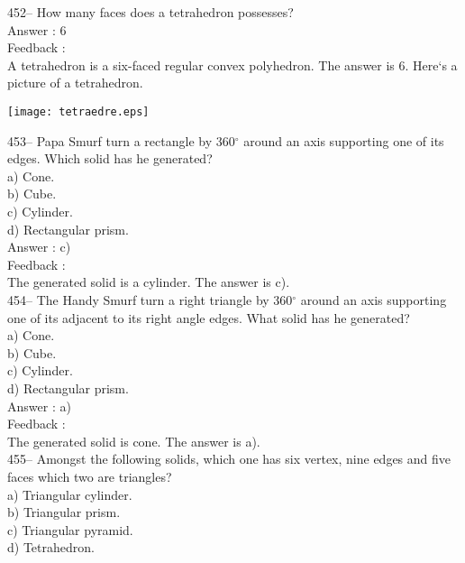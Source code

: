 \documentclass[letterpaper, 12pt]{article}
\begin{document}
452-- How many faces does a tetrahedron possesses?\\

Answer : 6\\

Feedback : \\
A tetrahedron is a six-faced regular convex polyhedron.  The answer is 6.  Here`s a picture of a tetrahedron.\\
    \begin{center}
    \texttt{[image: tetraedre.eps]}
    \end{center}


453--  Papa Smurf turn a rectangle by 360$^{\circ}$ around an axis supporting one of its edges. Which solid has he generated?\\
a) Cone.\\
b) Cube.\\
c) Cylinder.\\
d) Rectangular prism.\\


Answer : c)\\

Feedback :\\
The generated solid is a cylinder.  The answer is c).\\


454--  The Handy Smurf turn a right triangle by 360$^{\circ}$ around an axis supporting one of its adjacent to its right angle edges. What solid has he generated?\\
a) Cone.\\
b) Cube.\\
c) Cylinder.\\
d) Rectangular prism.\\

Answer : a)\\

Feedback :\\
The generated solid is cone.  The answer is a).\\

455-- Amongst the following solids, which one has six vertex, nine edges and five faces which two are triangles?\\
a) Triangular cylinder.\\
b) Triangular prism.\\
c) Triangular pyramid.\\
d) Tetrahedron.\\
\end{document}
